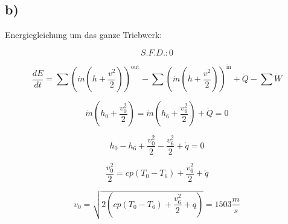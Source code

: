 

\subsection*{b)}

Energiegleichung um das ganze Triebwerk:

\[
S.F.D.: 0
\]

\[
\frac{dE}{dt} = \sum \left( \dot{m} \left( h + \frac{v^2}{2} \right) \right)^{\text{out}} - \sum \left( \dot{m} \left( h + \frac{v^2}{2} \right) \right)^{\text{in}} + \dot{Q} - \sum \dot{W}
\]

\[
\dot{m} \left( h_0 + \frac{v_0^2}{2} \right) = \dot{m} \left( h_6 + \frac{v_6^2}{2} \right) + \dot{Q} = 0
\]

\[
h_0 - h_6 + \frac{v_0^2}{2} - \frac{v_6^2}{2} + \dot{q} = 0
\]

\[
\frac{v_0^2}{2} = cp \left( T_0 - T_6 \right) + \frac{v_6^2}{2} + \dot{q}
\]

\[
v_0 = \sqrt{2 \left( cp \left( T_0 - T_6 \right) + \frac{v_6^2}{2} + q \right)} = 1503 \frac{m}{s}
\]